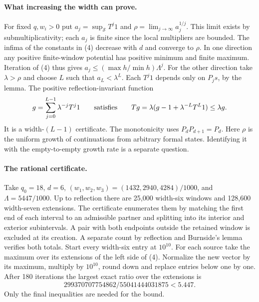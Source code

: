 \paragraph{What increasing the width can prove.}
For fixed \(q,w_i>0\) put \(a_j=\sup_{\mathcal S} T^j1\) and
\(\rho=\lim_{j\to\infty}a_j^{1/j}\). This limit exists by
submultiplicativity; each \(a_j\) is finite since the local multipliers
are bounded. The infima of the constants in (4) decrease with \(d\)
and converge to \(\rho\). In one direction any positive finite-window
potential has positive minimum and finite maximum. Iteration of (4)
thus gives \(a_j\le (\max h/\min h)\Lambda^j\). For the other direction
take \(\lambda>\rho\) and choose \(L\) such that \(a_L<\lambda^L\).
Each \(T^j1\) depends only on \(P_j s\), by the lemma. The positive
reflection-invariant function
\[
 g=\sum_{j=0}^{L-1}\lambda^{-j}T^j1
 \qquad\hbox{satisfies}\qquad
 Tg=\lambda(g-1+\lambda^{-L}T^L1)\le\lambda g .
\]
It is a width-\((L-1)\) certificate. The monotonicity uses
\(P_dP_{d+1}=P_d\). Here \(\rho\) is the uniform growth of continuations
from arbitrary formal states. Identifying it with the empty-to-empty
growth rate is a separate question.

\paragraph{The rational certificate.}
Take \(q_0=18\), \(d=6\), \((w_1,w_2,w_3)=(1432,2940,4284)/1000\),
and \(\Lambda=5447/1000\). Up to reflection there are 25,000 width-six
windows and 128,600 width-seven extensions. The certificate enumerates
them by matching the first end of each interval to an admissible partner
and splitting into its interior and exterior subintervals. A pair with
both endpoints outside the retained window is excluded at its creation.
A separate count by reflection and Burnside's lemma verifies both totals.
Start every width-six entry at \(10^{10}\). For each source take the
maximum over its extensions of the left side of (4). Normalize the new
vector by its maximum, multiply by \(10^{10}\), round down and replace
entries below one by one. After 180 iterations the largest exact ratio
over the extensions is
\[
   299370707754862/55041444031875 < 5.447 .
\]
Only the final inequalities are needed for the bound.

